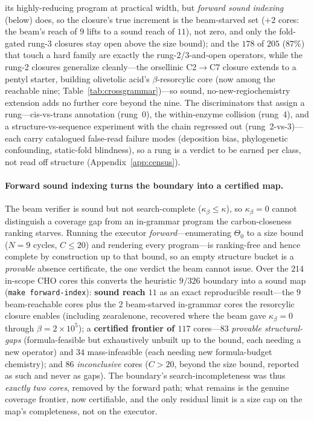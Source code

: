 \documentclass[11pt]{article}
\theoremstyle{definition}
\begin{document}
its highly-reducing program at practical width, but \emph{forward sound indexing} (below) does, so the
closure's true increment is the beam-starved set ($+2$ cores: the beam's reach of $9$ lifts to a sound
reach of $11$), not zero, and only the
fold-gated rung-3 closures stay open above the size bound); and the $178$ of $205$ ($87\%$) that touch a hard family are exactly the
rung-2/3-and-open operators, while the rung-2 closures generalize cleanly---the orsellinic C2$\to$C7
closure extends to a pentyl starter, building olivetolic acid's $\beta$-resorcylic core (now among the
reachable nine; Table~\ref{tab:crossgrammar})---so sound, no-new-regiochemistry extension adds no further
core beyond the nine. The
discriminators that assign a rung---cis-vs-trans annotation (rung~0), the within-enzyme collision
(rung~4), and a structure-vs-sequence experiment with the chain regressed out (rung~2-vs-3)---each carry
catalogued false-read failure modes (deposition bias, phylogenetic confounding, static-fold blindness),
so a rung is a verdict to be earned per class, not read off structure (Appendix~\ref{app:census}).

\paragraph{Forward sound indexing turns the boundary into a certified map.} The beam verifier is sound but
not search-complete ($\kappa_\beta\le\kappa$), so $\kappa_\beta{=}0$ cannot distinguish a coverage gap from an
in-grammar program the carbon-closeness ranking starves. Running the executor \emph{forward}---enumerating
$\Theta_0$ to a size bound ($N{=}9$ cycles, $C{\le}20$) and rendering every program---is ranking-free and
hence complete by construction up to that bound, so an empty structure bucket is a \emph{provable} absence
certificate, the one verdict the beam cannot issue. Over the $214$ in-scope CHO cores this converts the
heuristic $9/326$ boundary into a sound map (\texttt{make forward-index}): \textbf{sound reach $11$} as an exact reproducible
result---the $9$
beam-reachable cores plus the $2$ beam-starved in-grammar cores the resorcylic closure enables (including
zearalenone, recovered where the beam gave $\kappa_\beta{=}0$ through $\beta{=}2{\times}10^{5}$); a
\textbf{certified frontier of $117$} cores---$83$ \emph{provable structural-gaps} (formula-feasible but
exhaustively unbuilt up to the bound, each needing a new operator) and $34$ mass-infeasible (each needing new
formula-budget chemistry); and $86$ \emph{inconclusive} cores ($C{>}20$, beyond the size bound, reported as
such and never as gaps). The boundary's search-incompleteness was thus \emph{exactly two cores}, removed by
the forward path; what remains is the genuine coverage frontier, now certifiable, and the only residual limit
is a size cap on the map's completeness, not on the executor.
\end{document}
